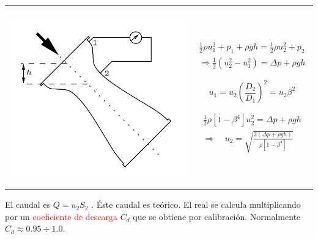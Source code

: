 	\begin{tabular}{cc}
		\begin{minipage}[c]{0.4\textwidth}%
			\begin{center}
				\includegraphics[width=\linewidth]{TeX_files/chapter04-Dinamica/venturi}
			\end{center}
		\end{minipage} & %
		\begin{minipage}[c]{0.4\textwidth}%
			
			\begin{align*}
				\frac{1}{2}\rho u_{1}^{2}+p_{1}+\rho gh=\frac{1}{2}\rho u_{2}^{2}+p_{2}\\
				\Rightarrow\frac{1}{2}\left(u_{2}^{2}-u_{1}^{2}\right)=\Delta p+\rho gh
			\end{align*}
			
			\[
			u_{1}=u_{2}\left(\frac{D_{2}}{D_{1}}\right)^{2}=u_{2}\beta^{2}
			\]
			
			\begin{align*}
				\frac{1}{2}\rho\left[1-\beta^{4}\right]u_{2}^{2}=\Delta p+\rho gh\\
				\Rightarrow\quad u_{2}=\sqrt{\frac{2\left(\Delta p+\rho gh\right)}{\rho\left[1-\beta^{4}\right]}}
			\end{align*}
		\end{minipage}\tabularnewline
	\end{tabular}

	
	El caudal es $Q=u_{2}S_{2}$ . Éste caudal es teórico. El real se
	calcula multiplicando por un \textcolor{red}{coeficiente de descarga}
	$C_{d}$ que se obtiene por calibración. Normalmente $C_{d}\approx0.95\div1.0$.
	
